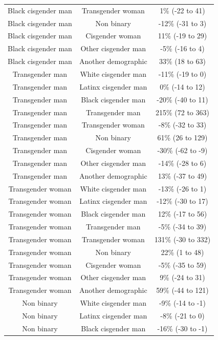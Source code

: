 \documentclass[
  letterpaper,
  DIV=11,
  numbers=noendperiod,
  oneside]{scrreprt}
\begin{document}
\begin{longtable*}{ccc}
Black cisgender man & Transgender woman & 1\% (-22 to 41)  \\ 
Black cisgender man & Non binary & -12\% (-31 to 3)  \\ 
Black cisgender man & Cisgender woman & 11\% (-19 to 29)  \\ 
Black cisgender man & Other cisgender man & -5\% (-16 to 4)  \\ 
Black cisgender man & Another demographic & 33\% (18 to 63)  \\ 
Transgender man & White cisgender man & -11\% (-19 to 0)  \\ 
Transgender man & Latinx cisgender man & 0\% (-14 to 12)  \\ 
Transgender man & Black cisgender man & -20\% (-40 to 11)  \\ 
Transgender man & Transgender man & 215\% (72 to 363)  \\ 
Transgender man & Transgender woman & -8\% (-32 to 33)  \\ 
Transgender man & Non binary & 61\% (26 to 129)  \\ 
Transgender man & Cisgender woman & -30\% (-62 to -9)  \\ 
Transgender man & Other cisgender man & -14\% (-28 to 6)  \\ 
Transgender man & Another demographic & 13\% (-37 to 49)  \\ 
Transgender woman & White cisgender man & -13\% (-26 to 1)  \\ 
Transgender woman & Latinx cisgender man & -12\% (-30 to 17)  \\ 
Transgender woman & Black cisgender man & 12\% (-17 to 56)  \\ 
Transgender woman & Transgender man & -5\% (-34 to 39)  \\ 
Transgender woman & Transgender woman & 131\% (-30 to 332)  \\ 
Transgender woman & Non binary & 22\% (1 to 48)  \\ 
Transgender woman & Cisgender woman & -5\% (-35 to 59)  \\ 
Transgender woman & Other cisgender man & 9\% (-24 to 31)  \\ 
Transgender woman & Another demographic & 59\% (-44 to 121)  \\ 
Non binary & White cisgender man & -9\% (-14 to -1)  \\ 
Non binary & Latinx cisgender man & -8\% (-21 to 0)  \\ 
Non binary & Black cisgender man & -16\% (-30 to -1)  \\ 

\end{longtable*}
\end{document}
